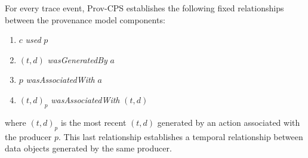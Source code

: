 For every trace event, Prov-CPS establishes the following fixed relationships between the provenance model components:
\begin{enumerate}
 \item $c$ \textit{used} $p$
 \item $(t,d)$ \textit{wasGeneratedBy} $a$
 \item $p$ \textit{wasAssociatedWith} $a$
 \item $(t,d)_{p}$ \textit{wasAssociatedWith} $(t,d)$
\end{enumerate}
where $(t,d)_{p}$ is the most recent $(t,d)$ generated by an action associated with the producer $p$. This last relationship establishes a temporal relationship between data objects generated by the same producer.

 
% 
% 


